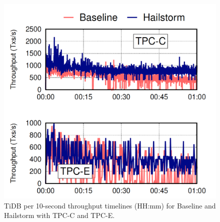 \documentclass[a4paper,10pt,twoside]{article}
\begin{document}
\begin{figure}[h]
    \centering
	\includegraphics[scale=0.3]{TiDB_result.png}
    \caption{TiDB per 10-second throughput timelines (HH:mm)
	for Baseline and Hailstorm with TPC-C and TPC-E.}
    \label{fig:mesh1}
\end{figure}
\end{document}
